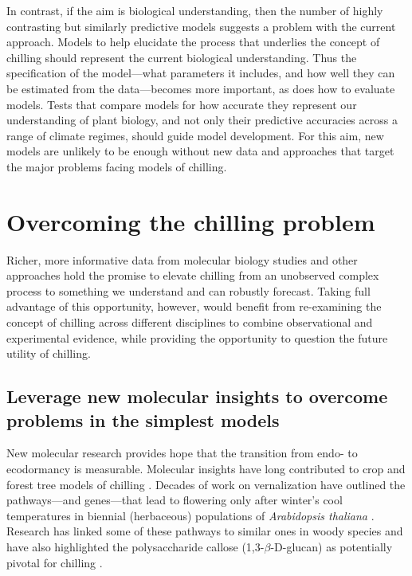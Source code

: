 \documentclass[11pt]{article}
\begin{document}
In contrast, if the aim is biological understanding, then the number of highly contrasting but similarly predictive models suggests a problem with the current approach. Models to help elucidate the process that underlies the concept of chilling should represent the current biological understanding. Thus the specification of the model---what parameters it includes, and how well they can be estimated from the data---becomes more important, as does how to evaluate models. Tests that compare models for how accurate they represent our understanding of plant biology, and not only their predictive accuracies across a range of climate regimes, should guide model development. For this aim, new models are unlikely to be enough without new data and approaches that target the major problems facing models of chilling.


\section*{Overcoming the chilling problem}

Richer, more informative data from molecular biology studies and other approaches \citep{fouche2023transport,walde2024stable} hold the promise to elevate chilling from an unobserved complex process to something we understand and can robustly forecast. Taking full advantage of this opportunity, however, would benefit from re-examining the concept of chilling across different disciplines to combine observational and experimental evidence, while providing the opportunity to question the future utility of chilling.

\subsection*{Leverage new molecular insights to overcome problems in the simplest models}

New molecular research provides hope that the transition from endo- to ecodormancy is measurable. Molecular insights have long contributed to crop and forest tree models of chilling \citep{chuinearees}. Decades of work on vernalization have outlined the pathways---and genes---that lead to flowering only after winter's cool temperatures in biennial (herbaceous) populations of \emph{Arabidopsis thaliana} \citep[Figure \ref{fig:modelsketch},][]{Wilczek:2009oa,kim2009vernalization}. Research has linked some of these pathways to similar ones in woody species and have also highlighted the polysaccharide callose (1,3-$\beta$-{\sc D}-glucan) as potentially pivotal for chilling \citep{vanderschoot2014,pan2021aba}. 
\end{document}

